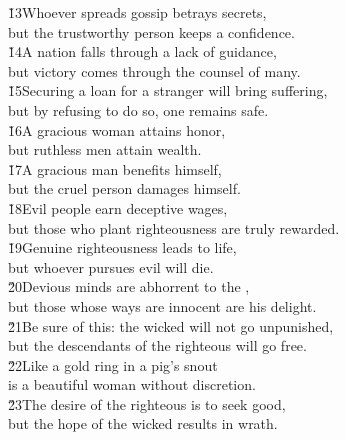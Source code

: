 \begin{poetry}
\poeml \v{13}Whoever spreads gossip betrays secrets, \\
\poemll    but the trustworthy person keeps a confidence. \\
\poeml \v{14}A nation falls through a lack of guidance, \\
\poemll    but victory comes through the counsel of many. \\
\poeml \v{15}Securing a loan for a stranger will bring suffering, \\
\poemll    but by refusing to do so, one remains safe. \\
\poeml \v{16}A gracious woman attains honor, \\
\poemll    but ruthless men attain wealth. \\
\poeml \v{17}A gracious man benefits himself, \\
\poemll    but the cruel person damages himself. \\
\poeml \v{18}Evil people earn deceptive wages, \\
\poemll    but those who plant righteousness are truly rewarded. \\
\poeml \v{19}Genuine righteousness leads to life, \\
\poemll    but whoever pursues evil will die. \\
\poeml \v{20}Devious minds are abhorrent to the , \\
\poemll    but those whose ways are innocent are his delight. \\
\poeml \v{21}Be sure of this: the wicked will not go unpunished, \\
\poemll    but the descendants of the righteous will go free. \\
\poeml \v{22}Like a gold ring in a pig's snout \\
\poemll    is a beautiful woman without discretion. \\
\poeml \v{23}The desire of the righteous is to seek good, \\
\poemll    but the hope of the wicked results in wrath. \\

\end{poetry}
